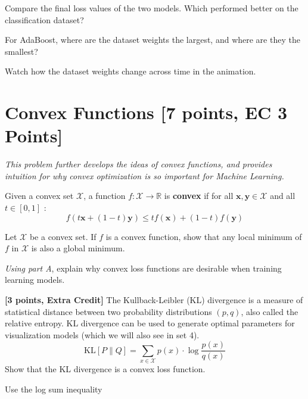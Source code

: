 \begin{problem}[2]
    Compare the final loss values of the two models. Which performed better on the classification dataset?
\end{problem}

\begin{solution}
  
\end{solution}

\begin{problem}[2]
    For AdaBoost, where are the dataset weights the largest, and where are they the smallest?
\end{problem}
\begin{hint}
    Watch how the dataset weights change across time in the animation.
\end{hint}
\begin{solution}
   
\end{solution}

\newpage
\section{Convex Functions [7 points, EC 3 Points]}

\emph{This problem further develops the ideas of convex functions, and provides intuition for why convex optimization is so important for
 Machine Learning.}

Given a convex set $\mathcal{X}$, a function $f:\mathcal{X}\to\mathbb{R}$ is \textbf{convex} if for all $\textbf{x},\textbf{y}\in \mathcal{X}$ and all $t\in[0,1]$ :
\[f(t\textbf{x} + (1-t)\textbf{y}) \leq tf(\textbf{x}) + (1-t)f(\textbf{y})\]

\begin{problem}[3]
Let $\mathcal{X}$ be a convex set. If $f$ is a convex function, show that any local minimum of $f$ in $\mathcal{X}$ is also a global minimum.
\end{problem}

\begin{solution}
   
\end{solution}

\begin{problem}[4]
\emph{Using part A}, explain why convex loss functions are desirable when training learning models.
\end{problem}

\begin{solution}
   
\end{solution}
\problem\textbf{[3 points, Extra Credit] }
The Kullback-Leibler (KL) divergence is a measure of statistical distance between two probability distributions $(p, q)$, also called the relative entropy. KL divergence can be used to generate optimal parameters for visualization models (which we will also see in set 4).
\[\mathrm{KL}[P\|Q] = \sum_{x\in\mathcal{X}} p(x) \cdot \log \frac{p(x)}{q(x)}\]
Show that the KL divergence is a convex loss function. \\

\begin{hint}
    Use the log sum inequality
\end{hint}

\begin{solution}
   
\end{solution}
